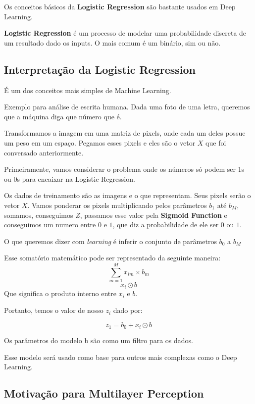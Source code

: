 \documentclass[11pt, a4paper]{article}
\begin{document}
Os conceitos básicos da \textbf{Logistic Regression} são bastante usados em Deep Learning.

\textbf{Logistic Regression} é um processo de modelar uma probabilidade discreta de um resultado dado os inputs. O mais comum é um binário, sim ou não.

\subsection{Interpretação da Logistic Regression}

É um dos conceitos mais simples de Machine Learning.

Exemplo para análise de escrita humana.
Dada uma foto de uma letra, queremos que a máquina diga que número que é.

Transformamos a imagem em uma matriz de pixels, onde cada um deles possue um peso em um espaço. Pegamos esses pixels e eles são o vetor $X$ que foi conversado anteriormente.

Primeiramente, vamos considerar o problema onde os números só podem ser 1s ou 0s para encaixar na Logistic Regression.

Os dados de treinamento são as imagens e o que representam. Seus pixels serão o vetor $X$.
Vamos ponderar os pixels multiplicando pelos parâmetros $b_1$ até $b_M$, somamos, conseguimos $Z$, passamos esse valor pela \textbf{Sigmoid Function} e conseguimos um numero entre $0$ e $1$, que diz a probabilidade de ele ser $0$ ou $1$.

\begin{center}
O que queremos dizer com \textit{learning} é inferir o conjunto de parâmetros $b_0$ a $b_M$
\end{center}

Esse somatório matemático pode ser representado da seguinte maneira:
\[ \sum_{m=1}^{M} x_{im} \times b_m \]
\[ x_i \odot b \]
Que significa o produto interno entre $x_i$ e $b$.

Portanto, temos o valor de nosso $z_i$ dado por:

\[ z_1 = b_0 + x_i \odot b \]

Os parâmetros do modelo b são como um filtro para os dados.

Esse modelo será usado como base para outros mais complexas como o Deep Learning.

\subsection{Motivação para Multilayer Perception}
\end{document}
